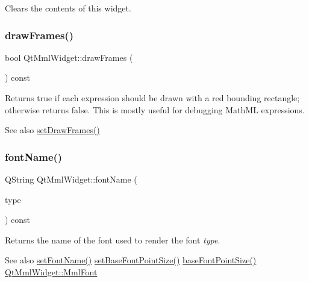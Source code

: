 Clears the contents of this widget. \mbox{\label{class_qt_mml_widget_a744050e1126d7713c806fcd9c8ae545f}} 
\subsubsection{\texorpdfstring{draw\+Frames()}{drawFrames()}}
{\footnotesize\ttfamily bool Qt\+Mml\+Widget\+::draw\+Frames (\begin{DoxyParamCaption}{ }\end{DoxyParamCaption}) const}

Returns true if each expression should be drawn with a red bounding rectangle; otherwise returns false. This is mostly useful for debugging Math\+ML expressions.

\begin{DoxySeeAlso}{See also}
\mbox{\hyperlink{class_qt_mml_widget_ad24aab1ee535bc028e730b620b3232dc}{set\+Draw\+Frames()}} 
\end{DoxySeeAlso}
\mbox{\label{class_qt_mml_widget_ab8a069c5d6a449e3d9d67e6b818172d9}} 
\subsubsection{\texorpdfstring{font\+Name()}{fontName()}}
{\footnotesize\ttfamily Q\+String Qt\+Mml\+Widget\+::font\+Name (\begin{DoxyParamCaption}\item[{\mbox{\hyperlink{class_qt_mml_widget_ac3fde39f7b605557d80bded69f985d2a}{Mml\+Font}}}]{type }\end{DoxyParamCaption}) const}

Returns the name of the font used to render the font {\itshape type}.

\begin{DoxySeeAlso}{See also}
\mbox{\hyperlink{class_qt_mml_widget_afbc5b98c9d39c328270a9d65d58b0b7a}{set\+Font\+Name()}} \mbox{\hyperlink{class_qt_mml_widget_ab13b093180da6bc6e9f928f4a02321a8}{set\+Base\+Font\+Point\+Size()}} \mbox{\hyperlink{class_qt_mml_widget_ab255d9d35bca5f04d5828fabed87d5af}{base\+Font\+Point\+Size()}} \mbox{\hyperlink{class_qt_mml_widget_ac3fde39f7b605557d80bded69f985d2a}{Qt\+Mml\+Widget\+::\+Mml\+Font}} 
\end{DoxySeeAlso}
\mbox{\label{class_qt_mml_widget_ab13b093180da6bc6e9f928f4a02321a8}} 
